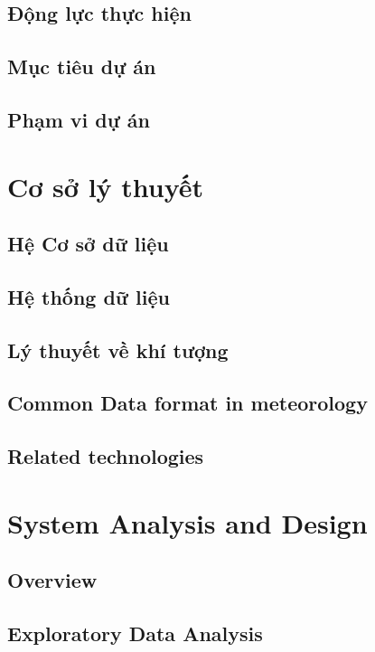 \documentclass[12pt, a4paper]{report}
\theoremstyle{definition}
\begin{document}
\section{Động lực thực hiện}

\section{Mục tiêu dự án}

\section{Phạm vi dự án}


\newpage
\chapter{Cơ sở lý thuyết}
\section{Hệ Cơ sở dữ liệu}

\section{Hệ thống dữ liệu}

\section{Lý thuyết về khí tượng}

\section{Common Data format in meteorology}

\section{Related technologies}


\newpage
\chapter{System Analysis and Design}
\section{Overview}

\section{Exploratory Data Analysis}

\end{document}
